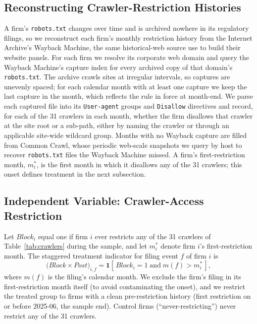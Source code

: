 \documentclass[12pt]{article}
\begin{document}
\subsection{Reconstructing Crawler-Restriction Histories}\label{sec:data_robots}
A firm's \texttt{robots.txt} changes over time and is archived nowhere in its regulatory filings, so we reconstruct each firm's monthly restriction history from the Internet Archive's Wayback Machine, the same historical-web source \citet{BoullandBourveauBreuer2026} use to build their website panels. For each firm we resolve its corporate web domain and query the Wayback Machine's capture index for every archived copy of that domain's \texttt{robots.txt}. The archive crawls sites at irregular intervals, so captures are unevenly spaced; for each calendar month with at least one capture we keep the last capture in the month, which reflects the rule in force at month-end. We parse each captured file into its \texttt{User-agent} groups and \texttt{Disallow} directives and record, for each of the 31 crawlers in each month, whether the firm disallows that crawler at the site root or a sub-path, either by naming the crawler or through an applicable site-wide wildcard group. Months with no Wayback capture are filled from Common Crawl, whose periodic web-scale snapshots we query by host to recover \texttt{robots.txt} files the Wayback Machine missed. A firm's first-restriction month, $m^{\ast}_i$, is the first month in which it disallows any of the 31 crawlers; this onset defines treatment in the next subsection.

\subsection{Independent Variable: Crawler-Access Restriction}\label{sec:data_iv}
Let $\mathit{Block}_i$ equal one if firm $i$ ever restricts any of the 31 crawlers of Table~\ref{tab:crawlers} during the sample, and let $m^{\ast}_i$ denote firm $i$'s first-restriction month. The staggered treatment indicator for filing event $f$ of firm $i$ is
\begin{equation}
\bigl(\mathit{Block}\times\mathit{Post}\bigr)_{i,f}
= \mathbf{1}\!\left[\,\mathit{Block}_i=1 \;\text{and}\; m(f) > m^{\ast}_i\,\right],
\end{equation}
where $m(f)$ is the filing's calendar month. We exclude the firm's filing in its first-restriction month itself (to avoid contaminating the onset), and we restrict the treated group to firms with a clean pre-restriction history (first restriction on or before 2025-06, the sample end). Control firms (``never-restricting'') never restrict any of the 31 crawlers.
\end{document}
